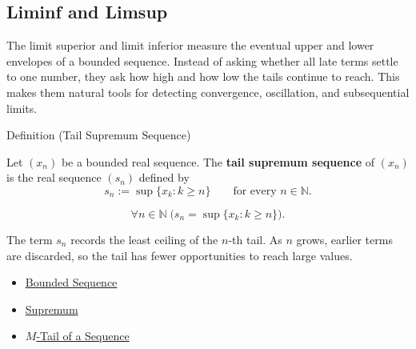 \subsection*{Liminf and Limsup}
\begin{exposition}
The limit superior and limit inferior measure the eventual upper and lower
envelopes of a bounded sequence. Instead of asking whether all late terms
settle to one number, they ask how high and how low the tails continue to
reach. This makes them natural tools for detecting convergence, oscillation,
and subsequential limits.
\end{exposition}


\begin{definitionbox}{Definition (Tail Supremum Sequence)}
\begin{definition}
\label{def:tail-supremum-sequence}
Let $(x_n)$ be a bounded real sequence. The \textbf{tail supremum
sequence} of $(x_n)$ is the real sequence $(s_n)$ defined by
\[
  s_n:=\sup\{x_k:k\ge n\}
  \qquad\text{for every } n\in\mathbb{N}.
\]
\end{definition}
\end{definitionbox}

\begin{remark*}
\[
\forall n\in\mathbb{N}\;
\bigl(s_n=\sup\{x_k:k\ge n\}\bigr).
\]
\end{remark*}

\begin{remark*}[Interpretation]
The term $s_n$ records the least ceiling of the $n$-th tail. As $n$ grows,
earlier terms are discarded, so the tail has fewer opportunities to reach
large values.
\end{remark*}

\begin{dependencies}
\begin{itemize}
  \item \hyperref[def:bounded-sequence]{Bounded Sequence}
  \item \hyperref[def:supremum]{Supremum}
  \item \hyperref[def:m-tail]{$M$-Tail of a Sequence}
\end{itemize}
\end{dependencies}



